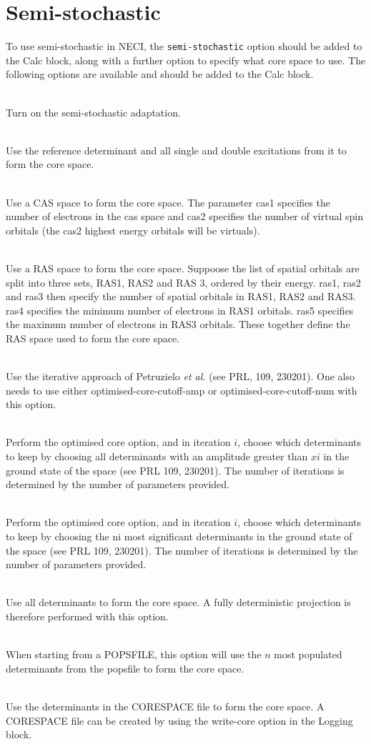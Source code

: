 \documentclass[a4paper,notitlepage]{scrreprt}
\newcommand\codeitem[1]{\needspace{1.5\baselineskip}\item[\textnormal{\ttfamily #1 \nopagebreak}] \hfill \\ \nopagebreak}
\let\code\lstinline
\begin{document}
\section{Semi-stochastic}

    To use semi-stochastic in NECI, the \code{semi-stochastic} option should
    be added to the Calc block, along with a further option to specify what
    core space to use. The following options are available and should be added
    to the Calc block.
    \begin{description}
		\codeitem{semi-stochastic}
            Turn on the semi-stochastic adaptation.
		\codeitem{doubles-core}
            Use the reference determinant and all single and double excitations
            from it to form the core space.
		\codeitem{cas-core cas1 cas2}
            Use a CAS space to form the core space. The parameter cas1 specifies
            the number of electrons in the cas space and cas2 specifies the
            number of virtual spin orbitals (the cas2 highest energy orbitals
            will be virtuals).
		\codeitem{ras-core ras1 ras2 ras3 ras4 ras5}
            Use a RAS space to form the core space. Suppoose the list of spatial
            orbitals are split into three sets, RAS1, RAS2 and RAS 3, ordered
            by their energy. ras1, ras2 and ras3 then specify the number of
            spatial orbitals in RAS1, RAS2 and RAS3. ras4 specifies the minimum
            number of electrons in RAS1 orbitals. ras5 specifies the maximum
            number of electrons in RAS3 orbitals. These together define the RAS
            space used to form the core space.
		\codeitem{optimised-core}
            Use the iterative approach of Petruzielo \emph{et al.} (see PRL,
            109, 230201). One also needs to use either optimised-core-cutoff-amp
            or optimised-core-cutoff-num with this option.
		\codeitem{optimised-core-cutoff-amp $x1$, $x2$, $x3$...}
            Perform the optimised core option, and in iteration $i$, choose
            which determinants to keep by choosing all determinants with an
            amplitude greater than $xi$ in the ground state of the space (see
            PRL 109, 230201). The number of iterations is determined by the
            number of parameters provided.
		\codeitem{optimised-core-cutoff-num $n1$, $n2$, $n3$...}
            Perform the optimised core option, and in iteration $i$, choose
            which determinants to keep by choosing the ni most significant
            determinants in the ground state of the space (see PRL 109, 230201).
            The number of iterations is determined by the number of parameters
            provided.
		\codeitem{fci-core}
            Use all determinants to form the core space. A fully deterministic
            projection is therefore performed with this option.
		\codeitem{pops-core $n$}
            When starting from a POPSFILE, this option will use the $n$ most
            populated determinants from the popsfile to form the core space.
		\codeitem{read-core}
            Use the determinants in the CORESPACE file to form the core space.
            A CORESPACE file can be created by using the write-core option in
            the Logging block.
    \end{description}
\end{document}
